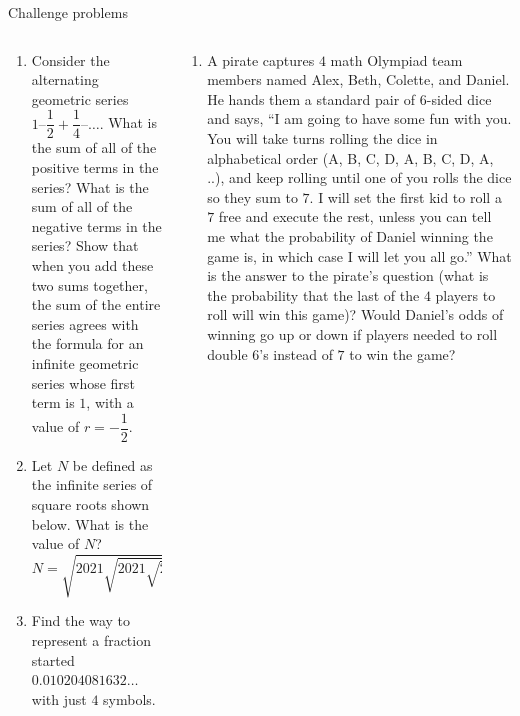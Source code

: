 \documentclass[9pt,aspectratio=169]{beamer}
\begin{document}
\begin{frame}{Challenge problems}
  \begin{columns}[T]
    \begin{column}{0.5\textwidth}
      \begin{enumerate}
        \item Consider the alternating geometric series 
        $1 – \dfrac{1}{2} + \dfrac{1}{4} – \ldots.$   What is the sum of all of the positive terms in the series?  What is the sum of all of the negative terms in the series?  Show that when you add these two sums together, the sum of the entire series agrees with the formula for an infinite geometric series whose first term is $1$, with a value of $r = -\dfrac{1}{2}$.
        \item Let $N$ be defined as the infinite series of square roots shown below.  What is the value of $N$?
        \[ N = \sqrt{2021 \sqrt{2021 \sqrt{2021 \sqrt{\ldots}}}}\]
        \item Find the way to represent a fraction started  $0.010204081632\ldots$ with just $4$ symbols.
        \seti
      \end{enumerate}
    \end{column}
    \begin{column}{0.5\textwidth}
      \begin{enumerate}
        \conti
        \item A pirate captures $4$ math Olympiad team members named Alex, Beth, Colette, and Daniel.  He hands them a standard pair of $6$-sided dice and says, “I am going to have some fun with you.  You will take turns rolling the dice in alphabetical order (A, B, C, D, A, B, C, D, A, ..), and keep rolling until one of you rolls the dice so they sum to $7$. 
        I will set the first kid to roll a $7$ free and execute the rest, unless you can tell me what the probability of Daniel winning the game is, in which case I will let you all go.”  What is the answer to the pirate’s question (what is the probability that the last of the $4$ players to roll will win this game)?  Would Daniel’s odds of winning go up or down if players needed to roll double $6$’s instead of $7$ to win the game?
      \end{enumerate}
    \end{column}
  \end{columns}
\end{frame}
\end{document}
